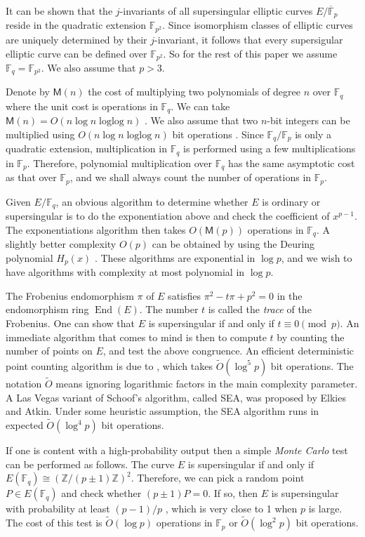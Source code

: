 \documentclass[12pt]{article}
\theoremstyle{plain}
\theoremstyle{definition}
\newcommand{\tildO}{\tilde{O}}
\DeclareMathOperator{\ringofend}{End} %
\DeclareMathOperator{\loglog}{loglog}
\def\Z{\ensuremath{\mathbb{Z}}}
\def\F{\ensuremath{\mathbb{F}}}
\def\MM{\ensuremath{\mathsf{M}}}
\begin{document}
It can be shown that the $j$-invariants of all supersingular elliptic curves $E / \overline{\F}_p$ 
reside in the quadratic extension $\F_{p^2}$. Since isomorphism classes of elliptic curves are 
uniquely determined by their $j$-invariant, it follows that every supersigular elliptic curve can 
be defined over $\F_{p^2}$. So for the rest of this paper we assume $\F_q = \F_{p^2}$. We also 
assume that $p > 3$.

Denote by $\MM(n)$ the cost of multiplying two polynomials of degree $n$ over $\F_q$ where the unit 
cost is operations in $\F_q$. We can take $\MM(n) = O(n\log n \loglog n)$ \cite{vzGG}. We also 
assume that two $n$-bit integers can be multiplied using $O(n\log n \loglog n)$ bit operations 
\cite{vzGG}. Since $\F_q / \F_p$ is only a quadratic extension, multiplication in $\F_q$ is 
performed using a few multiplications in $\F_p$. Therefore, polynomial multiplication over $\F_q$ 
has the same asymptotic cost as that over $\F_p$, and we shall always count the number of 
operations in $\F_p$.

Given $E / \F_q$, an obvious algorithm to determine whether $E$ is ordinary or supersingular is to 
do the exponentiation above and check the coefficient of $x^{p - 1}$. The exponentiations algorithm 
then takes $O(\MM(p))$ operations in $\F_q$. A slightly better complexity $O(p)$ can be obtained by 
using the Deuring polynomial $H_p(x)$ \cite[Theorem 4.1.b]{silverman2009arithmetic}. These 
algorithms are exponential in $\log p$, and we wish to have algorithms with complexity at most 
polynomial in $\log p$.

The Frobenius endomorphism $\pi$ of $E$ satisfies $\pi^2 - t\pi + p^2 = 0$ in the endomorphism ring 
$\ringofend(E)$. The number $t$ is called the \textit{trace} of the Frobenius. One can show that 
$E$ is supersingular if and only if $t \equiv 0 \pmod{p}$. An immediate algorithm that comes to 
mind is then to compute $t$ by counting the number of points on $E$, and test the above congruence. 
An efficient deterministic point counting algorithm is due to \cite{schoof85}, which takes 
$\tildO(\log^5 p)$ bit operations. The notation $\tildO$ means ignoring logarithmic factors in the 
main complexity parameter. A Las Vegas variant of Schoof's algorithm, called SEA, was proposed by 
Elkies and Atkin. Under some heuristic assumption, the SEA algorithm runs in expected 
$\tildO(\log^4p)$ bit operations.  

If one is content with a high-probability output then a simple \textit{Monte Carlo} test can be 
performed as follows. The curve $E$ is supersingular if and only if $E(\F_q) \cong (\Z/(p \pm 
1)\Z)^2$. Therefore, we can pick a random point $P \in E(\F_q)$ and check whether $(p \pm 1)P = 0$. 
If so, then $E$ is supersingular with probability at least $(p - 1) / p$ \cite[Prop. 
2]{sutherland2012}, which is very close to 1 when $p$ is large. The cost of this test is 
$\tildO(\log p)$ operations in $\F_p$ or $\tildO(\log^2 p)$ bit operations.
\end{document}
